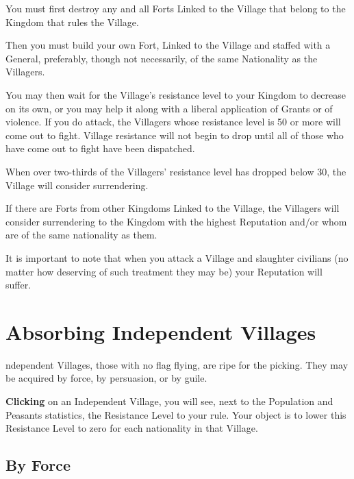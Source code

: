 You must first destroy any and all Forts Linked to the Village that belong to the Kingdom that rules the Village.


Then you must build your own Fort, Linked to the Village and staffed with a General, preferably, though not necessarily, of the same Nationality as the Villagers.


You may then wait for the Village’s resistance level to your Kingdom to decrease on its own, or you may help it along with a liberal application of Grants or of violence. If you do attack, the Villagers whose resistance level is 50 or more will come out to fight. Village resistance will not begin to drop until all of those who have come out to fight have been dispatched.


When over two-thirds of the Villagers’ resistance level has dropped below 30, the Village will consider surrendering.

If there are Forts from other Kingdoms Linked to the Village, the Villagers will consider surrendering to the Kingdom with the highest Reputation and/or whom are of the same nationality as them.


It is important to note that when you attack a Village and slaughter civilians (no matter how deserving of such treatment they may be) your Reputation will suffer.

\section{Absorbing Independent Villages}


ndependent Villages, those with no flag flying, are ripe for the picking. They may be acquired by force, by persuasion, or by guile.


\textbf{Clicking} on an Independent Village, you will see, next to the Population and Peasants statistics, the Resistance Level to your rule. Your object is to lower this Resistance Level to zero for each nationality in that Village.

\subsection{By Force}

